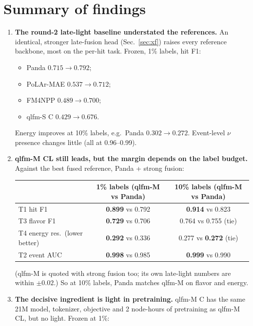 \documentclass[11pt,a4paper]{article}
\newcommand{\best}[1]{\textbf{#1}}
\begin{document}
\tableofcontents
\clearpage

\section{Summary of findings}
\begin{enumerate}[leftmargin=*]
\item \textbf{The round-2 late-light baseline understated the references.} An identical, stronger late-fusion head (Sec.~\ref{sec:xf}) raises every reference backbone, most on the per-hit task. Frozen, 1\% labels, hit F1:
  \begin{itemize}
    \item Panda $0.715\to0.792$;
    \item PoLAr-MAE $0.537\to0.712$;
    \item FM4NPP $0.489\to0.700$;
    \item qlfm-S C $0.429\to0.676$.
  \end{itemize}
  Energy improves at 10\% labels, e.g.\ Panda $0.302\to0.272$. Event-level $\nu$ presence changes little (all at 0.96--0.99).

\item \textbf{qlfm-M CL still leads, but the margin depends on the label budget.} Against the best fused reference, Panda + strong fusion:

  \begin{center}\small
  \begin{tabular}{lcc}
  \toprule
   & 1\% labels (qlfm-M vs Panda) & 10\% labels (qlfm-M vs Panda)\\
  \midrule
  T1 hit F1 & \best{0.899} vs 0.792 & \best{0.914} vs 0.823\\
  T3 flavor F1 & \best{0.729} vs 0.706 & 0.764 vs 0.755 (tie)\\
  T4 energy res.\ (lower better) & \best{0.292} vs 0.336 & 0.277 vs \best{0.272} (tie)\\
  T2 event AUC & \best{0.998} vs 0.985 & \best{0.999} vs 0.990\\
  \bottomrule
  \end{tabular}
  \end{center}

  (qlfm-M is quoted with strong fusion too; its own late-light numbers are within $\pm0.02$.) So at 10\% labels, Panda matches qlfm-M on flavor and energy.

\item \textbf{The decisive ingredient is light in pretraining.} qlfm-M C has the same 21M model, tokenizer, objective and 2 node-hours of pretraining as qlfm-M CL, but no light. Frozen at 1\%:


\end{enumerate}
\end{document}

